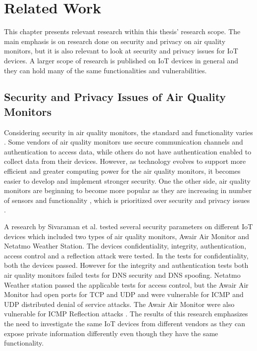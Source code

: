 \chapter{Related Work}
This chapter presents relevant research within this thesis' research scope. The main emphasis is on research done on security and privacy on air quality monitors, but it is also relevant to look at security and privacy issues for \gls{IoT} devices. A larger scope of research is published on \gls{IoT} devices in general and they can hold many of the same functionalities and vulnerabilities.

\section{Security and Privacy Issues of Air Quality Monitors}
Considering security in air quality monitors, the standard and functionality varies \cite{AQMHowFarFunctionality}. Some vendors of air quality monitors use secure communication channels and authentication to access data, while others do not have authentication enabled to collect data from their devices. However, as technology evolves to support more efficient and greater computing power for the air quality monitors, it becomes easier to develop and implement stronger security. One the other side, air quality monitors are beginning to become more popular as they are increasing in number of sensors and functionality , which is prioritized over security and privacy issues \cite{SecurityAndDataIntInAQM}.

A research by Sivaraman et al. \cite{IoTSecurityandPrivacyImpl} tested several security parameters on different \gls{IoT} devices which included two types of air quality monitors, Awair Air Monitor and Netatmo Weather Station. The devices confidentiality, integrity, authentication, access control and a reflection attack were tested. In the tests for confidentiality, both the devices passed. However for the integrity and authentication tests both air quality monitors failed tests for \gls{DNS} security and \gls{DNS} spoofing. Netatmo Weather station passed the applicable tests for access control, but the Awair Air Monitor had open ports for \gls{TCP} and \gls{UDP} and were vulnerable for \gls{ICMP} and \gls{UDP} distributed denial of service attacks. The Awair Air Monitor were also vulnerable for ICMP Reflection attacks \cite{IoTSecurityandPrivacyImpl}. The results of this research emphasizes the need to investigate the same \gls{IoT} devices from different vendors as they can expose private information differently even though they have the same functionality. 

